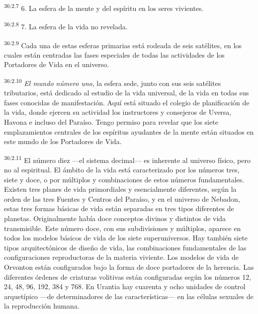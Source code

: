 \par
\textsuperscript{36:2.7} 6. La esfera de la mente y del espíritu en los seres vivientes.

\par
\textsuperscript{36:2.8} 7. La esfera de la vida no revelada.

\par
\textsuperscript{36:2.9} Cada una de estas esferas primarias está rodeada de seis satélites, en los cuales están centradas las fases especiales de todas las actividades de los Portadores de Vida en el universo.

\par
\textsuperscript{36:2.10} \textit{El mundo número uno}, la esfera sede, junto con sus seis satélites tributarios, está dedicado al estudio de la vida universal, de la vida en todas sus fases conocidas de manifestación. Aquí está situado el colegio de planificación de la vida, donde ejercen su actividad los instructores y consejeros de Uversa, Havona e incluso del Paraíso. Tengo permiso para revelar que los siete emplazamientos centrales de los espíritus ayudantes de la mente están situados en este mundo de los Portadores de Vida.

\par
\textsuperscript{36:2.11} El número diez ---el sistema decimal--- es inherente al universo físico, pero no al espiritual. El ámbito de la vida está caracterizado por los números tres, siete y doce, o por múltiplos y combinaciones de estos números fundamentales. Existen tres planes de vida primordiales y esencialmente diferentes, según la orden de las tres Fuentes y Centros del Paraíso, y en el universo de Nebadon, estas tres formas básicas de vida están separadas en tres tipos diferentes de planetas. Originalmente había doce conceptos divinos y distintos de vida transmisible. Este número doce, con sus subdivisiones y múltiplos, aparece en todos los modelos básicos de vida de los siete superuniversos. Hay también siete tipos arquitectónicos de diseño de vida, las combinaciones fundamentales de las configuraciones reproductoras de la materia viviente. Los modelos de vida de Orvonton están configurados bajo la forma de doce portadores de la herencia. Las diferentes órdenes de criaturas volitivas están configuradas según los números 12, 24, 48, 96, 192, 384 y 768. En Urantia hay cuarenta y ocho unidades de control arquetípico ---de determinadores de las características--- en las células sexuales de la reproducción humana.

